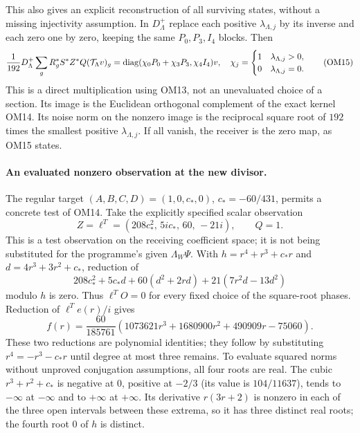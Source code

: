 This also gives an explicit reconstruction of all surviving states,
without a missing injectivity assumption.  In $D_{\Lambda}^{+}$
replace each positive $\lambda_{\Lambda,j}$ by its inverse and each
zero one by zero, keeping the same $P_0,P_3,I_4$ blocks.  Then
\[
\frac1{192}D_\Lambda^+
\sum_gR_g^*S^*Z^*Q(\mathcal T_\Lambda v)_g
=\operatorname{diag}(\chi_0P_0+\chi_3P_3,\chi_4I_4)v,
\quad
\chi_j=\begin{cases}1&\lambda_{\Lambda,j}>0,\\0&\lambda_{\Lambda,j}=0.
\end{cases}
\tag{OM15}
\]
This is a direct multiplication using OM13, not an unevaluated
choice of a section.  Its image is the Euclidean orthogonal
complement of the exact kernel OM14.  Its noise norm on the
nonzero image is the reciprocal square root of $192$ times the
smallest positive $\lambda_{\Lambda,j}$.  If all vanish, the
receiver is the zero map, as OM15 states.

\paragraph{An evaluated nonzero observation at the new divisor.}
The regular target $(A,B,C,D)=(1,0,c_*,0)$, $c_*=-60/431$, permits
a concrete test of OM14.  Take the explicitly specified scalar
observation
\[
Z=\ell^T=(208c_*^2,\,5ic_*,\,60,\,-21i),\qquad Q=1.
\tag{OM16}
\]
This is a test observation on the receiving coefficient space;
it is not being substituted for the programme's given $\Lambda_W\Psi$.
With $h=r^4+r^3+c_*r$ and $d=4r^3+3r^2+c_*$, reduction of
\[
208c_*^2+5c_*d+60(d^2+2rd)+21(7r^2d-13d^2)
\]
modulo $h$ is zero.  Thus $\ell^TO=0$ for every fixed choice of
the square-root phases.  Reduction of $\ell^T e(r)/i$ gives
\[
f(r)=\frac{60}{185761}
 (1073621r^3+1680900r^2+490909r-75060).
\tag{OM17}
\]
These two reductions are polynomial identities; they follow by
substituting $r^4=-r^3-c_*r$ until degree at most three remains.
To evaluate squared norms without unproved conjugation assumptions,
all four roots are real.  The cubic $r^3+r^2+c_*$ is negative at
$0$, positive at $-2/3$ (its value is $104/11637$), tends to
$-\infty$ at $-\infty$ and to $+\infty$ at $+\infty$.
Its derivative $r(3r+2)$ is nonzero in each of the three open
intervals between these extrema, so it has three distinct real
roots; the fourth root $0$ of $h$ is distinct.

